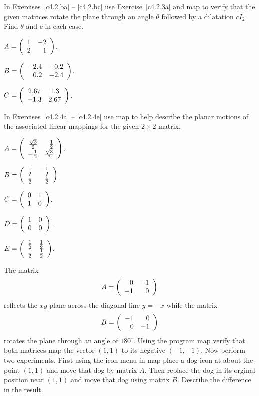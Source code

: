 \noindent In Exercises~\ref{c4.2.ba} -- \ref{c4.2.bc} use
Exercise~\ref{c4.2.3a} and {\sf map} to verify that the given matrices
rotate the plane through an angle $\theta$ followed by a dilatation $cI_2$.
Find $\theta$ and $c$ in each case.
\begin{exercise}  \label{c4.2.ba}
$A=\left(\begin{array}{rr} 1 & -2\\ 2 &1\end{array}\right)$.
\end{exercise}
\begin{exercise}  \label{c4.2.bb}
$B=\left(\begin{array}{rr} -2.4 & -0.2\\ 0.2 &-2.4\end{array}\right)$.
\end{exercise}
\begin{exercise}  \label{c4.2.bc}
$C=\left(\begin{array}{cc} 2.67 & 1.3\\ -1.3 &2.67\end{array}\right)$.
\end{exercise}


\noindent In Exercises~\ref{c4.2.4a} -- \ref{c4.2.4e} use {\sf map} to
help describe the planar motions of the associated linear mappings for the
given $2\times 2$ matrix.
\begin{exercise} \label{c4.2.4a}
$A=\left(\begin{array}{rr} \frac{\sqrt{3}}{2} & \frac{1}{2}\\ -\frac{1}{2} &\frac{\sqrt{3}}{2}\end{array}\right)$.
\end{exercise}
\begin{exercise} \label{c4.2.4b}
$B = \left(\begin{array}{rr} \frac{1}{2} & -\frac{1}{2}\\ \frac{1}{2} &\frac{1}{2}\end{array}\right)$.
\end{exercise}
\begin{exercise} \label{c4.2.4c}
$C = \left(\begin{array}{rr} 0 & 1\\ 1 &0\end{array}\right)$.
\end{exercise}
\begin{exercise} \label{c4.2.4d}
$D = \left(\begin{array}{rr} 1 & 0\\ 0 &0\end{array}\right)$.
\end{exercise}
\begin{exercise} \label{c4.2.4e}
$E = \left(\begin{array}{rr} \frac{1}{2} & \frac{1}{2}\\ \frac{1}{2} &\frac{1}{2}\end{array}\right)$.
\end{exercise}

\begin{exercise}  \label{c4.2.5}
The matrix 
\[
A = \left(\begin{array}{rr} 0 & -1\\ -1 &0\end{array}\right)
\]
reflects the $xy$-plane across the diagonal line $y=-x$ while the matrix
\[
B=\left(\begin{array}{rr} -1 & 0\\ 0 &-1\end{array}\right)
\]
rotates the plane through an angle of $180^\circ$. Using the program 
{\sf map} verify that both matrices map the vector $(1,1)$ to its negative
$(-1,-1)$.  Now perform two experiments.  First using the {\sf icon} menu in 
{\sf map} place a dog icon at about the point $(1,1)$ and move that dog by 
matrix $A$.  Then replace the dog in its orginal position near $(1,1)$ and 
move that dog using matrix $B$.  Describe the difference in the result.
\end{exercise}   


